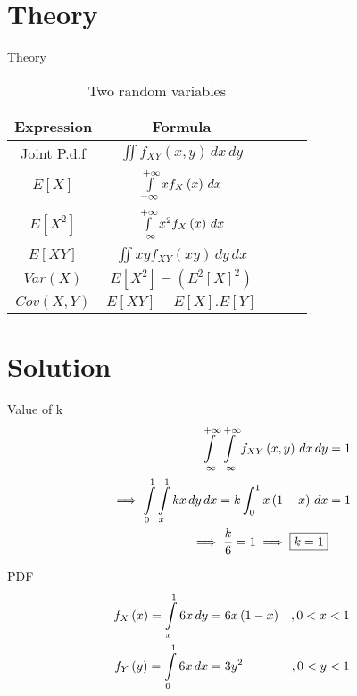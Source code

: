 \documentclass{beamer}
\providecommand{\brak}[1]{\ensuremath{\left(#1\right)}}
\begin{document}
\section{Theory}
\begin{frame}{Theory}

\begin{table}[ht!]
    \centering
    \begin{tabular}{|c|c|c|c|c}
    \hline
    \textbf{Expression} & \textbf{Formula}\\
    \hline\hline
    Joint P.d.f & $\iint f_{XY}\brak{x,y}\,dx\,dy$\\
    \hline
    $E[X]$ & $\Int_{-\infty}^{+\infty}x f_{X}\brak{x}\,dx$\\
    \hline
    $E[X^2]$ & $\Int_{-\infty}^{+\infty}x^2 f_{X}\brak{x}\,dx$\\
    \hline
    $E[XY]$ & $\iint xy f_{XY}\brak{xy} \,dy\,dx$\\
    \hline
    $Var\brak{X}$ & $E[X^2]-\brak{E^2[X]^2}$\\
    \hline
    $Cov\brak{X,Y}$ & $E[XY]-E[X].E[Y]$\\
    \hline
    \end{tabular}
    \caption{Two random variables}
    \label{tab:my_label}
\end{table}
\end{frame}

\section{Solution}
\begin{frame}{Value of k}
\begin{align}
  \Int_{-\infty}^{+\infty} \Int_{-\infty}^{+\infty}f_{XY}\brak{x,y}\,dx\,dy &= 1\\
  \implies \Int_{0}^{1} \Int_{x}^{1} kx \,dy\,dx=k \int_{0}^{1} x\brak{1-x} \,dx &= 1\\
  \implies \frac{k}{6}=1  \implies \boxed{k=1}
\end{align}
\end{frame}

\begin{frame}{PDF}
\begin{align}
    f_{X}\brak{x}=\Int_{x}^{1} 6x \,dy&=6x\brak{1-x} &,0<x<1\\
    f_{Y}\brak{y}=\Int_{0}^{1} 6x \,dx&=3y^ 2&,0<y<1 
\end{align}
\end{frame}
\end{document}
